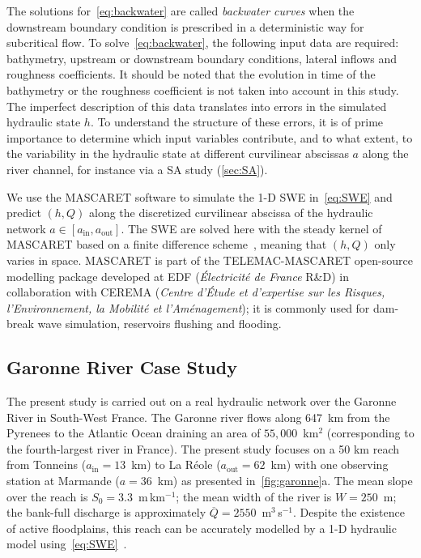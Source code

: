 The solutions for~\cref{eq:backwater} are called {\it backwater curves} when the downstream boundary condition is prescribed in a deterministic way for subcritical flow. To solve~\cref{eq:backwater}, the following input data are required: bathymetry, upstream or downstream boundary conditions, lateral inflows and roughness coefficients. It should be noted that the evolution in time of the bathymetry or the roughness coefficient is not taken into account in this study. The imperfect description of this data translates into errors in the simulated hydraulic state $h$. To understand the structure of these errors, it is of prime importance to determine which input variables contribute, and to what extent, to the variability in the hydraulic state at different curvilinear abscissas $a$ along the river channel, for instance via a SA study (\cref{sec:SA}).

We use the MASCARET software to simulate the 1-D SWE in~\cref{eq:SWE} and predict $(h, Q)$ along the discretized curvilinear abscissa of the hydraulic network $a \in [a_{\text{in}}, a_{\text{out}}]$. The SWE are solved here with the steady kernel of MASCARET based on a finite difference scheme~\citep{goutal2002,goutal2012}, meaning that $(h,Q)$ only varies in space. MASCARET is part of the TELEMAC-MASCARET open-source modelling package developed at EDF (\textit{Électricité de France} R\&D) in collaboration with CEREMA (\textit{Centre d'Étude et d'expertise sur les Risques, l'Environnement, la Mobilité et l'Aménagement}); it is commonly used for dam-break wave simulation, reservoirs flushing and flooding. 

\subsection{Garonne River Case Study}

The present study is carried out on a real hydraulic network over the Garonne River in South-West France. The Garonne river flows along 647~km from the Pyrenees to the Atlantic Ocean draining an area of $55,000$~km$^2$ (corresponding to the fourth-largest river in France). The present study focuses on a 50 km reach from Tonneins ($a_{\text{in}} = 13$~km) to La Réole ($a_{\text{out}} = 62$~km) with one observing station at Marmande ($a = 36$~km) as presented in~\cref{fig:garonne}a. The mean slope over the reach is $S_0 = 3.3$~m\,km$^{-1}$; the mean width of the river is $W = 250$~m; the bank-full discharge is approximately $\overline{Q} = 2550$~m$^3$\,s$^{-1}$. Despite the existence of active floodplains, this reach can be accurately modelled by a 1-D hydraulic model using~\cref{eq:SWE}~\citep{besnard2011}.

